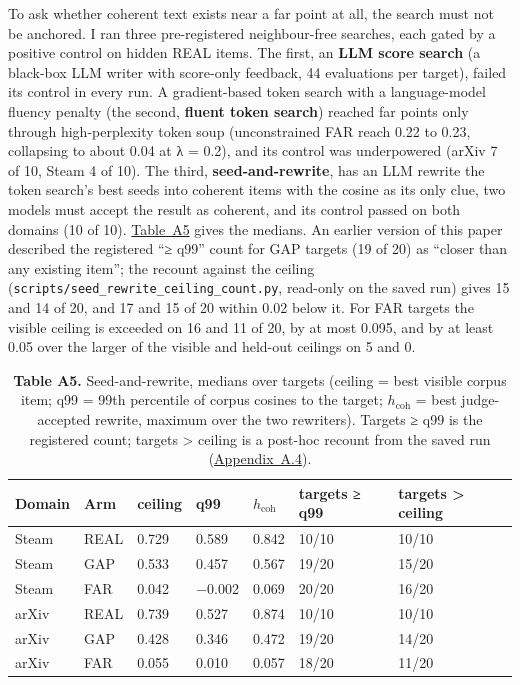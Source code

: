 \documentclass[
  10pt,
]{article}
\begin{document}
To ask whether coherent text exists near
a far point at all, the search must not
be anchored. I ran three pre-registered
neighbour-free searches, each gated by a
positive control on hidden REAL items.
The first, an \textbf{LLM score search}
(a black-box LLM writer with score-only
feedback, 44 evaluations per target),
failed its control in every run. A
gradient-based token search with a
language-model fluency penalty (the
second, \textbf{fluent token search})
reached far points only through
high-perplexity token soup
(unconstrained FAR reach 0.22 to 0.23,
collapsing to about 0.04 at λ = 0.2),
and its control was underpowered (arXiv
7 of 10, Steam 4 of 10). The third,
\textbf{seed-and-rewrite}, has an LLM
rewrite the token search's best seeds
into coherent items with the cosine as
its only clue, two models must accept
the result as coherent, and its control
passed on both domains (10 of 10).
\hyperref[tab:A5]{Table~A5} gives the
medians. An earlier version of this
paper described the registered ``≥ q99''
count for GAP targets (19 of 20) as
``closer than any existing item''; the
recount against the ceiling
(\texttt{scripts/\allowbreak{}seed\_\allowbreak{}rewrite\_\allowbreak{}ceiling\_\allowbreak{}count.py},
read-only on the saved run) gives 15 and
14 of 20, and 17 and 15 of 20 within
0.02 below it. For FAR targets the
visible ceiling is exceeded on 16 and 11
of 20, by at most 0.095, and by at least
0.05 over the larger of the visible and
held-out ceilings on 5 and 0.

\begin{table}[tbp]
\centering\footnotesize\setlength{\tabcolsep}{4pt}
\caption[]{\textbf{Table A5.} Seed-and-rewrite, medians over targets (ceiling = best visible corpus item; q99 = 99th percentile of corpus cosines to the target; \(h_\mathrm{coh}\) = best judge-accepted rewrite, maximum over the two rewriters). Targets ≥ q99 is the registered count; targets \textgreater{} ceiling is a post-hoc recount from the saved run (\hyperref[app:A.4]{Appendix~A.4}).}\label{tab:A5}
\begin{tabular}{@{}lllllll@{}}
\toprule
Domain & Arm & ceiling & q99 & \(h_\mathrm{coh}\) & targets ≥ q99 & targets \textgreater{} ceiling \\
\midrule
Steam & REAL & 0.729 & 0.589 & 0.842 & 10/10 & 10/10 \\
Steam & GAP & 0.533 & 0.457 & 0.567 & 19/20 & 15/20 \\
Steam & FAR & 0.042 & −0.002 & 0.069 & 20/20 & 16/20 \\
arXiv & REAL & 0.739 & 0.527 & 0.874 & 10/10 & 10/10 \\
arXiv & GAP & 0.428 & 0.346 & 0.472 & 19/20 & 14/20 \\
arXiv & FAR & 0.055 & 0.010 & 0.057 & 18/20 & 11/20 \\
\bottomrule
\end{tabular}
\end{table}
\end{document}
